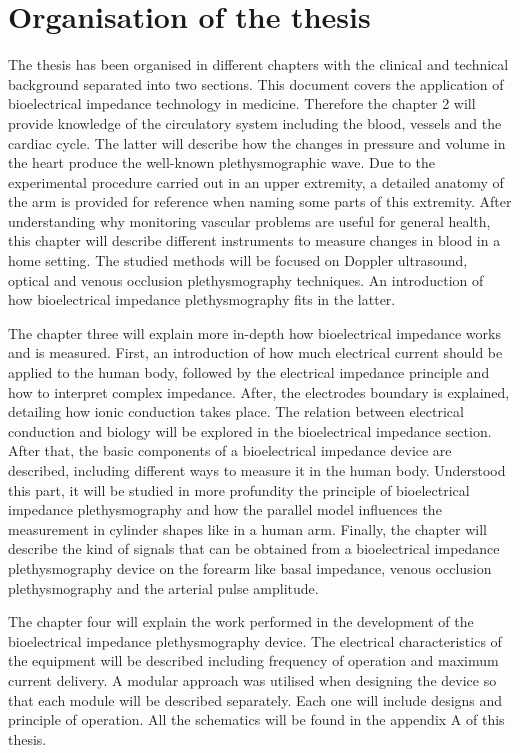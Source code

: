 \section{Organisation of the thesis}
The thesis has been organised in different chapters with the clinical and technical background separated into two sections. This document covers the application of bioelectrical impedance technology in medicine. Therefore the chapter 2 will provide knowledge of the circulatory system including the blood, vessels and the cardiac cycle. The latter will describe how the changes in pressure and volume in the heart produce the well-known plethysmographic wave. Due to the experimental procedure carried out in an upper extremity, a detailed anatomy of the arm is provided for reference when naming some parts of this extremity. After understanding why monitoring vascular problems are useful for general health, this chapter will describe different instruments to measure changes in blood in a home setting. The studied methods will be focused on Doppler ultrasound, optical and venous occlusion plethysmography techniques. An introduction of how bioelectrical impedance plethysmography fits in the latter.

The chapter three will explain more in-depth how bioelectrical impedance works and is measured. First, an introduction of how much electrical current should be applied to the human body, followed by the electrical impedance principle and how to interpret complex impedance. After, the electrodes boundary is explained, detailing how ionic conduction takes place. The relation between electrical conduction and biology will be explored in the bioelectrical impedance section.  After that, the basic components of a bioelectrical impedance device are described, including different ways to measure it in the human body. Understood this part, it will be studied in more profundity the principle of bioelectrical impedance plethysmography and how the parallel model influences the measurement in cylinder shapes like in a human arm. Finally, the chapter will describe the kind of signals that can be obtained from a bioelectrical impedance plethysmography device on the forearm like basal impedance, venous occlusion plethysmography and the arterial pulse amplitude.

The chapter four will explain the work performed in the development of the bioelectrical impedance plethysmography device. The electrical characteristics of the equipment will be described including frequency of operation and maximum current delivery. A modular approach was utilised when designing the device so that each module will be described separately.  Each one will include designs and principle of operation. All the schematics will be found in the appendix A of this thesis. 

